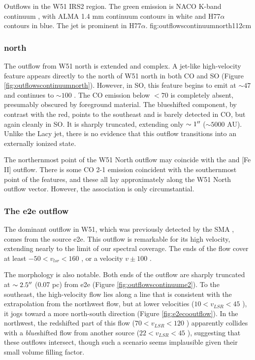\documentclass{aa}
\begin{document}
{Outflows in the W51 IRS2 region.  The green emission is NACO K-band continuum
\citep{Barbosa2008a}, with ALMA 1.4 mm continuum contours in white and
H77$\alpha$ contours in blue.  The \citet{Lacy2007a} jet is prominent in
H77$\alpha$.}
{fig:outflowscontinuumnorth}{1}{12cm}

\subsubsection{north}
The outflow from W51 north is extended and complex.
A jet-like high-velocity feature appears directly to the north of W51 north in
both CO and SO (Figure \ref{fig:outflowscontinuumnorth}).  However, in SO, this feature begins to emit at $\sim47$ \kms
and continues to $\sim 100$ \kms.  The CO emission below $<70$ \kms is
completely absent, presumably obscured by foreground material.  The blueshifted
component, by contrast with the red, points to the southeast and is barely
detected in CO, but again cleanly in SO.  It is sharply truncated, extending
only $\sim1 \mbox{$^{\prime\prime}$}$ ($\sim5000$ AU).  Unlike the Lacy jet, there is no
evidence that this outflow transitions into an externally ionized state.

The northernmost point of the W51 North outflow may coincide with
the \citet{Hodapp2002a} \hh and [Fe II] outflow.  There is some CO 2-1
emission coincident with the southernmost point of the \hh features,
and these all lay approximately along the W51 North outflow vector.
However, the association is only circumstantial.


\subsubsection{The e2e outflow}
The dominant outflow in W51, which was previously detected by the SMA
\citep{Shi2010a,Shi2010b}, comes from the source e2e.  This outflow is
remarkable for its high velocity, extending nearly to the limit of our spectral
coverage.  The ends of the flow cover at least $-50 < v_{lsr} < 160$ \kms, or a
velocity $v\pm100$ \kms.  

The morphology is also notable.  Both ends of the outflow are sharply truncated
at $\sim2.5\mbox{$^{\prime\prime}$}$ (0.07 pc) from e2e (Figure \ref{fig:outflowscontinuume2}).
To the southeast, the high-velocity flow lies along a line that is consistent
with the extrapolation from the northwest flow, but at lower velocities ($10 <
v_{LSR} < 45$ \kms), it jogs toward a more north-south direction (Figure
\ref{fig:e2ecooutflow}).  In the
northwest, the redshifted part of this flow ($70 < v_{LSR} < 120$ \kms)
apparently collides with a \emph{blue}shifted flow from another source ($22 <
v_{LSR} < 45$ \kms), suggesting that these outflows intersect, though such a
scenario seems  implausible given their small volume filling factor.
\end{document}

